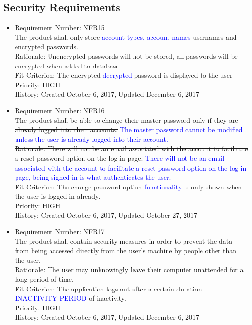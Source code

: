 \documentclass[12pt, titlepage]{article}
\begin{document}
\subsection{Security Requirements}
\begin{itemize}
	\item Requirement Number: NFR15\\
The product shall only store \textcolor{blue}{account types, account names} usernames and encrypted passwords.\\
Rationale: Unencrypted passwords will not be stored, all passwords will be encrypted when added to database.\\
Fit Criterion: The \sout{encrypted} \textcolor{blue}{decrypted} password is displayed to the user\\
Priority: HIGH\\
History: Created October 6, 2017, Updated December 6, 2017

	\item Requirement Number: NFR16\\
\sout{The product shall be able to change their master password only if they are already logged into their accounts.} \textcolor{blue}{The master password cannot be modified unless the user is already logged into their account.}\\
\sout{Rationale:  There will not be an email associated with the account to facilitate a reset password option on the log in page.} \textcolor{blue}{There will not be an email associated with the account to facilitate a reset password option on the log in page, being signed in is what authenticates the user.}\\
Fit Criterion: The change password \sout{option} \textcolor{blue}{functionality} is only shown when the user is logged in already.\\
Priority: HIGH\\
History: Created October 6, 2017, Updated October 27, 2017

	\item Requirement Number: NFR17\\
The product shall contain security measures in order to prevent the data from being accessed directly from the user’s machine by people other than the user.\\
Rationale: The user may unknowingly leave their computer unattended for a long period of time.\\
Fit Criterion: The application logs out after \sout{a certain duration} \textcolor{blue}{INACTIVITY-PERIOD} of inactivity.\\
Priority: HIGH\\
History: Created October 6, 2017, Updated December 6, 2017


\end{itemize}
\end{document}
